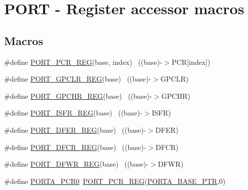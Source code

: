 \hypertarget{group___p_o_r_t___register___accessor___macros}{}\section{P\+O\+RT -\/ Register accessor macros}
\label{group___p_o_r_t___register___accessor___macros}
\subsection*{Macros}
\begin{DoxyCompactItemize}
\item 
\#define \hyperlink{group___p_o_r_t___register___accessor___macros_gac6f8c9eab2e63700616f4d4fa4a6ef0e}{P\+O\+R\+T\+\_\+\+P\+C\+R\+\_\+\+R\+EG}(base,  index)                              ~((base)-\/$>$P\+CR\mbox{[}index\mbox{]})
\item 
\#define \hyperlink{group___p_o_r_t___register___accessor___macros_gabbf5476f842aa7b313fdd3fedad41ca1}{P\+O\+R\+T\+\_\+\+G\+P\+C\+L\+R\+\_\+\+R\+EG}(base)                                      ~((base)-\/$>$G\+P\+C\+LR)
\item 
\#define \hyperlink{group___p_o_r_t___register___accessor___macros_ga5436d30f4741eacd3c61c337b626ab55}{P\+O\+R\+T\+\_\+\+G\+P\+C\+H\+R\+\_\+\+R\+EG}(base)                                      ~((base)-\/$>$G\+P\+C\+HR)
\item 
\#define \hyperlink{group___p_o_r_t___register___accessor___macros_gace6266e51916939b6ebd7cdb38394c6f}{P\+O\+R\+T\+\_\+\+I\+S\+F\+R\+\_\+\+R\+EG}(base)                                        ~((base)-\/$>$I\+S\+FR)
\item 
\#define \hyperlink{group___p_o_r_t___register___accessor___macros_gaf4400f8add6cb007e24074363387e938}{P\+O\+R\+T\+\_\+\+D\+F\+E\+R\+\_\+\+R\+EG}(base)                                        ~((base)-\/$>$D\+F\+ER)
\item 
\#define \hyperlink{group___p_o_r_t___register___accessor___macros_ga317b840ce4f1cdc8a67975e5ddc85b05}{P\+O\+R\+T\+\_\+\+D\+F\+C\+R\+\_\+\+R\+EG}(base)                                        ~((base)-\/$>$D\+F\+CR)
\item 
\#define \hyperlink{group___p_o_r_t___register___accessor___macros_gaea4b1adf59e177a14afea996b6e56d93}{P\+O\+R\+T\+\_\+\+D\+F\+W\+R\+\_\+\+R\+EG}(base)                                        ~((base)-\/$>$D\+F\+WR)
\item 
\#define \hyperlink{group___p_o_r_t___register___accessor___macros_gaf09680dfe5ed3f1f4df46364406b5d65}{P\+O\+R\+T\+A\+\_\+\+P\+C\+R0}~\hyperlink{group___p_o_r_t___register___accessor___macros_gac6f8c9eab2e63700616f4d4fa4a6ef0e}{P\+O\+R\+T\+\_\+\+P\+C\+R\+\_\+\+R\+EG}(\hyperlink{group___p_o_r_t___peripheral_gaa18ec7594fe603225220ec6eda4a19ce}{P\+O\+R\+T\+A\+\_\+\+B\+A\+S\+E\+\_\+\+P\+TR},0)

\end{DoxyCompactItemize}
